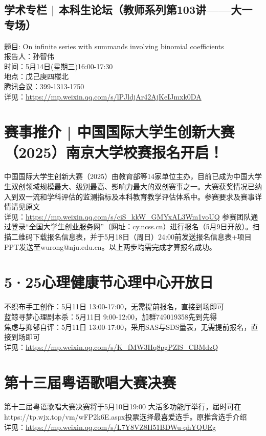 \documentclass[letterpaper, 12pt]{article}
\begin{document}
\begin{multicols}{2}
\subsection{学术专栏 | 本科生论坛（教师系列第103讲——大一专场）} %
题目: On infinite series with summands involving binomial coefficients
\\报告人：孙智伟
\\时间：5月14日(星期三)16:00-17:30
\\地点：戊己庚四楼北
\\腾讯会议：399-1313-1750
\\详见：\url{https://mp.weixin.qq.com/s/lPJldjAr42AjKeIJmxk0DA}


\section{赛事推介 | 中国国际大学生创新大赛（2025）南京大学校赛报名开启！} %
中国国际大学生创新大赛（2025）由教育部等14家单位主办，目前已成为中国大学生双创领域规模最大、级别最高、影响力最大的双创赛事之一。大赛获奖情况已纳入到双一流和学科评估的监测指标及本科教育教学评估体系中。参赛要求及赛事详情请见原文
\\详见：\url{https://mp.weixin.qq.com/s/ciS_kkW_GMYxAL3Wm1voUQ}
参赛团队通过登录“全国大学生创业服务网”（网址：cy.ncss.cn）进行报名（5月9日开放）。扫描二维码下载报名信息表，并于5月18日（周日）24:00前发送报名信息表+项目PPT发送至wurong@nju.edu.cn。以上两步均需完成才算报名成功。

\section{5·25心理健康节心理中心开放日} %
不织布手工创作：5月11日 13:00-17:00，无需提前报名，直接到场即可
\\蓝鲸寻梦心理剧本杀：5月11日 9:00-12:00，加群749019358先到先得
\\焦虑与抑郁自评：5月11日 13:00-17:00，采用SAS与SDS量表，无需提前报名，直接到场即可
\\详见：\url{https://mp.weixin.qq.com/s/K_fMW3Hq8pgPZlS_CBMdzQ}

\section{第十三届粤语歌唱大赛决赛} %
第十三届粤语歌唱大赛决赛将于5月10日19:00 大活多功能厅举行，届时可在https://tp.wjx.top/vm/wFP2k6E.aspx投票选择最喜爱选手。原推含选手介绍
\\详见：\url{https://mp.weixin.qq.com/s/L7Y8VZ8H51BDWu-qhYQUEg}


\end{multicols}
\end{document}
